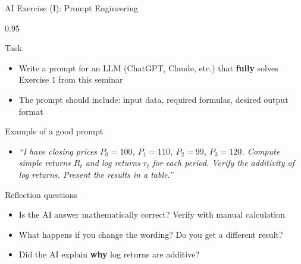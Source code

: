 \documentclass[9pt, aspectratio=169, t]{beamer}
\begin{document}
\begin{frame}[shrink=5]{AI Exercise (I): Prompt Engineering}
    \begin{cminipage}{0.95\textwidth}
    \begin{block}{Task}
    \begin{itemize}\setlength{\itemsep}{0pt}
        \item Write a prompt for an LLM (ChatGPT, Claude, etc.) that \textbf{fully} solves Exercise 1 from this seminar
        \item The prompt should include: input data, required formulas, desired output format
    \end{itemize}
    \end{block}
    \vspace{0.1cm}
    \begin{exampleblock}{Example of a good prompt}
    \begin{itemize}\setlength{\itemsep}{0pt}
        \item \textit{``I have closing prices $P_0=100$, $P_1=110$, $P_2=99$, $P_3=120$. Compute simple returns $R_t$ and log returns $r_t$ for each period. Verify the additivity of log returns. Present the results in a table.''}
    \end{itemize}
    \end{exampleblock}
    \vspace{0.1cm}
    \begin{alertblock}{Reflection questions}
    \begin{itemize}\setlength{\itemsep}{0pt}
        \item Is the AI answer mathematically correct? Verify with manual calculation
        \item What happens if you change the wording? Do you get a different result?
        \item Did the AI explain \textbf{why} log returns are additive?
    \end{itemize}
    \end{alertblock}
    \end{cminipage}
\end{frame}
\end{document}
